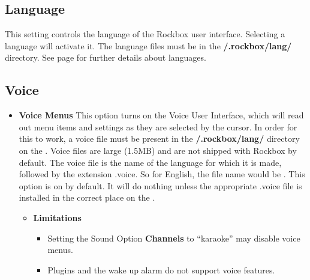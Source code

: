 \begin{itemize}
  \subsection{\label{ref:Language}Language}
  This setting controls the language of the Rockbox user interface. Selecting  a language will activate it. The language files must be in the \textbf{/.rockbox/lang/} directory. See page \pageref{ref:Loadinglanguages} for further details about languages.
  
  \subsection{\label{ref:Voiceconfiguration}Voice}
  
  \begin{itemize}
  \item \textbf{Voice Menus}
    This option turns on the Voice User Interface, which will read out menu items and settings as they are selected by the cursor.  In order for this to work, a voice file must be present in the \textbf{/.rockbox/lang/} directory on the \dap.  Voice files are large (1.5MB) and are not shipped with Rockbox by default.
    The voice file is the name of the language for which it is made, followed by the extension .voice.  So for English, the file name would be .
    This option is on by default.  It will do nothing unless the appropriate .voice file is installed in the correct place on the \dap.
    \begin{itemize}
    \item \textbf{Limitations}
      \begin{itemize}
      \item Setting the Sound Option \textbf{Channels} to ``karaoke'' may disable voice menus.
      \item Plugins and the wake up alarm do not support voice features.
      \end{itemize}
    \end{itemize}
    

\end{itemize}
\end{itemize}
